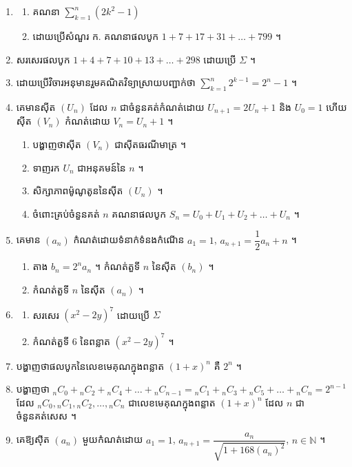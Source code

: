 \begin{enumerate}[1]
\begin{enumerate}[a]
  \end{enumerate}
  \item
  \begin{enumerate}[a]
    \item គណនា $\displaystyle\sum_{k=1}^{n} (2k^2 - 1)$
    \item ដោយប្រើសំណួរ ក. គណនាផលបូក $1 + 7 + 17 + 31 + \ldots + 799$ ។
  \end{enumerate}
  \item សរសេរផលបូក $1 + 4 + 7 + 10 + 13 + \ldots + 298$ ដោយប្រើ $\Sigma$ ។
  \item ដោយប្រើវិចារអនុមានរួមគណិតវិទ្យាស្រាយបញ្ជាក់ថា $\displaystyle\sum_{k=1}^{n} 2^{k-1} = 2^n - 1$ ។
  \item គេមានស៊ីត $(U_n)$ ដែល $n$ ជាចំនួនគត់កំណត់ដោយ $U_{n+1} = 2U_n + 1$ និង $U_0 = 1$ ហើយស៊ីត $(V_n)$ កំណត់ដោយ $V_n = U_n + 1$ ។
  \begin{enumerate}[a]
    \item បង្ហាញថាស៊ីត $(V_n)$ ជាស៊ីតធរណីមាត្រ ។
    \item ទាញរក $U_n$ ជាអនុគមន៍នៃ $n$ ។
    \item សិក្សាភាពម៉ូណូតូននៃស៊ីត $(U_n)$ ។
    \item ចំពោះគ្រប់ចំនួនគត់ $n$ គណនាផលបូក $S_n = U_0 + U_1 + U_2 + \ldots + U_n$ ។
  \end{enumerate}
  \item គេមាន $(a_n)$ កំណត់ដោយទំនាក់ទំនងកំណើន $a_1 = 1$, $a_{n+1} = \dfrac{1}{2}a_n + n$ ។
  \begin{enumerate}[a]
    \item តាង $b_n = 2^na_n$ ។ កំណត់តួទី $n$ នៃស៊ីត $(b_n)$ ។
    \item កំណត់តួទី $n$ នៃស៊ីត $(a_n)$ ។
  \end{enumerate}
  \item
  \begin{enumerate}[a]
    \item សរសេរ $(x^2 - 2y)^7$ ដោយប្រើ $\Sigma$
    \item កំណត់តួទី $6$ នៃពន្លាត $(x^2 - 2y)^7$ ។
  \end{enumerate}
  \item បង្ហាញថាផលបូកនៃលេខមេគុណក្នុងពន្លាត $(1 + x)^n$ គឺ $2^n$ ។
  \item បង្ហាញថា ${}_nC_0 + {}_nC_2 + {}_nC_4 + \ldots + {}_nC_{n-1} = {}_nC_1 + {}_nC_3 + {}_nC_5 + \ldots + {}_nC_n = 2^{n-1}$ ដែល ${}_nC_0, {}_nC_1, {}_nC_2, \ldots, {}_nC_n$ ជាលេខមេគុណក្នុងពន្លាត $(1 + x)^n$ ដែល $n$ ជាចំនួនគត់សេស ។
  \item គេឱ្យស៊ីត $(a_n)$ មួយកំណត់ដោយ $a_1 = 1$, $a_{n+1} = \dfrac{a_n}{\sqrt{1 + 168(a_n)^2}}$, $n \in \mathbb{N}$ ។

\end{enumerate}
